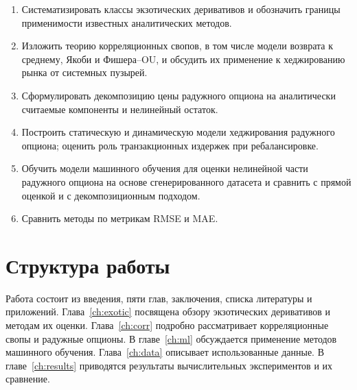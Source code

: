 \begin{enumerate}
  \item Систематизировать классы экзотических деривативов и обозначить
        границы применимости известных аналитических методов.
  \item Изложить теорию корреляционных свопов, в том числе модели
        возврата к среднему, Якоби и Фишера--OU, и обсудить их
        применение к хеджированию рынка от системных пузырей.
  \item Сформулировать декомпозицию цены радужного опциона на
        аналитически считаемые компоненты и нелинейный остаток.
  \item Построить статическую и динамическую модели хеджирования
        радужного опциона; оценить роль транзакционных издержек при
        ребалансировке.
  \item Обучить модели машинного обучения для оценки нелинейной части
        радужного опциона на основе сгенерированного датасета и сравнить
        с прямой оценкой и с декомпозиционным подходом.
  \item Сравнить методы по метрикам RMSE и MAE.
\end{enumerate}

\section*{Структура работы}

Работа состоит из введения, пяти глав, заключения, списка литературы
и приложений. Глава~\ref{ch:exotic} посвящена обзору экзотических
деривативов и методам их оценки. Глава~\ref{ch:corr} подробно
рассматривает корреляционные свопы и радужные опционы. В
главе~\ref{ch:ml} обсуждается применение методов машинного обучения.
Глава~\ref{ch:data} описывает использованные данные. В
главе~\ref{ch:results} приводятся результаты вычислительных
экспериментов и их сравнение.

\newpage
